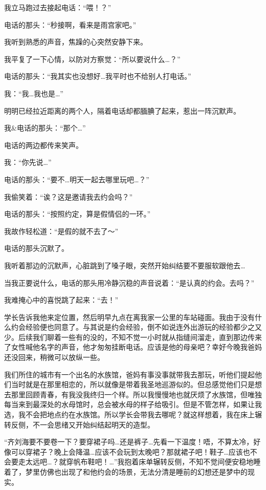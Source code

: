 我立马跑过去接起电话：“喂！？”

电话的那头：“秒接啊，看来是雨宫家吧。”

我听到熟悉的声音，焦躁的心突然安静下来。

我平复了一下心情，以防对方察觉：“所以要说什么…？”

电话的那头：“我其实也没想好…我平时也不给别人打电话。”

我：“我…我也是…”

明明已经拉近距离的两个人，隔着电话却都腼腆了起来，惹出一阵沉默声。



我\&电话的那头：“那个…”

电话的两边都传来笑声。

我：“你先说…”

电话的那头：“要不…明天一起去哪里玩吧…？”

我偷笑着：“诶？这是邀请我去约会吗？”

电话的那头：“按照约定，算是假情侣的一环。”

我故作轻松道：“是假的就不去了～”

电话的那头沉默了。

我听着那边的沉默声，心脏跳到了嗓子眼，突然开始纠结要不要服软跟他去…

当我正要说什么，电话的那头用冷静沉稳的声音说着：“是认真的约会。去吗？”

我难掩心中的喜悦跳了起来：“去！”

学长告诉我他来定位置，然后明早九点在离我家一公里的车站碰面。我由于没有什么约会经验便也同意了。与其说是约会经验，倒不如说连外出游玩的经验都少之又少。后续我们聊着一些有的没的，不知不觉一小时就从指缝间溜走，直到那边传来了女性喊他名字的声音，他才匆匆挂断电话。应该是他的母亲吧？幸好今晚我爸妈还没回来，稍微可以放纵一些。

我们所住的城市有一个出名的水族馆，爸妈有事没事就带我去那玩，听他们提起他们当时就是在那里相恋的，所以就像是带着我圣地巡游似的。但总感觉他们只是想去那里回顾青春，有我没我终归一个样。所以我慢慢地也就厌烦了水族馆，但唯独每当来到最深处的水母馆时，总会被水母的样子给吸引。但是不管怎样，如果让我选，我不会把地点约在水族馆。所以学长会带我去哪呢？就这样想着，我在床上辗转反侧，不一会思绪又开始纠结起明天的造型。

“齐刘海要不要卷一下？要穿裙子吗…还是裤子…先看一下温度！唔，不算太冷，好像可以穿裙子？晚上会降温…应该不会玩到太晚吧？那就裙子吧！鞋子…应该也不会要走太远吧…？就穿帆布鞋吧！…”我抱着床单辗转反侧，不知不觉间便安稳地睡着了，梦里仿佛也出现了和他约会的场景，无法分清是睡前的幻想还是梦中的现实。

